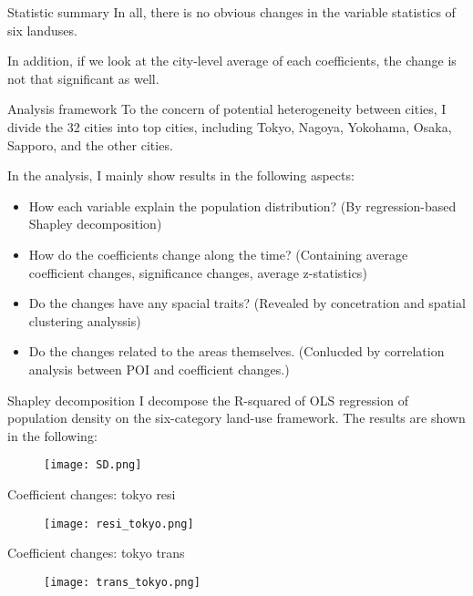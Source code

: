 \documentclass[aspectratio=169,xcolor=dvipsnames]{beamer}
\begin{document}
\begin{frame}{Statistic summary}
	In all, there is no obvious changes in the variable statistics of six landuses.\par 
	In addition, if we look at the city-level average of each coefficients, the change is not that significant as well.
\end{frame}
\begin{frame}{}
	
\end{frame}
\begin{frame}{Analysis framework}
To the concern of potential heterogeneity between cities, I divide the 32 cities into top cities, including Tokyo, Nagoya, Yokohama, Osaka, Sapporo, and the other cities.\par 
	In the analysis, I mainly show results in the following aspects:
\begin{itemize}
	\item How each variable explain the population distribution? (By regression-based Shapley decomposition)
	\item How do the coefficients change along the time? (Containing average coefficient changes, significance changes, average z-statistics)
	\item Do the changes have any spacial traits? (Revealed by concetration and spatial clustering analyssis)
	\item Do the changes related to the areas themselves. (Conlucded by correlation analysis between POI and coefficient changes.)
\end{itemize}
\end{frame}
\begin{frame}{Shapley decomposition}
	I decompose the R-squared of OLS regression of population density on the six-category land-use framework. The results are shown in the following:
	\begin{figure}
	\texttt{[image: SD.png]}
	\end{figure}	\end{frame}
\begin{frame}{Coefficient changes: tokyo resi}
\begin{figure}
	\texttt{[image: resi\_tokyo.png]}
\end{figure}
\end{frame}
\begin{frame}{Coefficient changes: tokyo trans}
	\begin{figure}
		\texttt{[image: trans\_tokyo.png]}
	\end{figure}
\end{frame}
\end{document}

